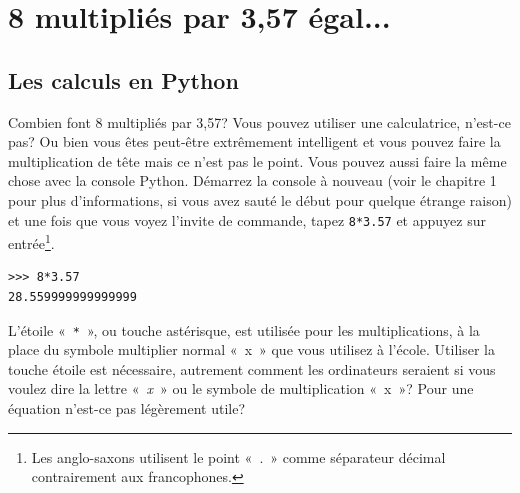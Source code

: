 

\chapter{8 multipliés par 3,57 égal...\label{chap:8}}
\section{Les calculs en Python}
Combien font 8 multipliés par 3,57? Vous pouvez utiliser une calculatrice, n'est-ce pas? 
Ou bien vous êtes peut-être extrêmement intelligent et vous pouvez faire la multiplication de tête mais ce n'est pas le point. 
Vous pouvez aussi faire la même chose avec la console Python.
Démarrez la console à nouveau (voir le chapitre 1 pour plus d'informations, si vous avez sauté le début pour quelque étrange raison) et une fois que vous voyez l'invite de commande, tapez \verb+8*3.57+ et appuyez sur entrée\footnote{Les anglo-saxons utilisent le point «~.~» comme séparateur décimal contrairement aux francophones.}.

\begin{Verbatim}[frame=single,rulecolor=\color{mbleu},label=à taper]
>>> 8*3.57
28.559999999999999
\end{Verbatim}

\setsansfont[Mapping=tex-text]{Linux Biolinum O}
L'étoile «~\verb+*+~», ou touche astérisque, est utilisée pour les multiplications,
à la place du symbole multiplier normal «~\textsf{x}~» que vous utilisez à l'école.
Utiliser la touche étoile est nécessaire, autrement comment les ordinateurs seraient si vous voulez dire la lettre «~\emph{x}~» ou le symbole de multiplication «~\textsf{x}~»? Pour une équation n'est-ce pas légèrement utile?


